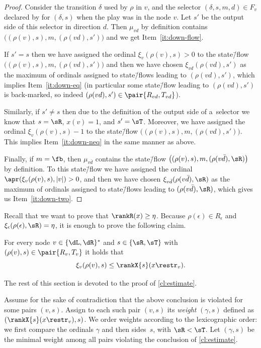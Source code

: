 \documentclass{lmcs}
\numberwithin{equation}{section}
\numberwithin{figure}{section}
\begin{document}
\begin{proof}	
	Consider the transition $\delta$ used by $\rho$ in $v$,
	and the selector $(\delta,s,m,d)\in F_v$ declared by \eve for $(\delta,s)$ when the play was in the node $v$.
	Let $s'$ be the output side of this selector in direction $d$.
	Then $\mu_{vd}$ by definition contains $\big((\rho(v),s),m,(\rho(vd),s')\big)$ and we get Item~\ref{it:down-flow}.

	If $s'=s$ then we have assigned the ordinal $\xi_v(\rho(v),s)>0$ to the state\=/flow $\big((\rho(v),s),\allowbreak m,\allowbreak (\rho(vd),s')\big)$
	and then we have chosen $\xi_{vd}(\rho(vd),s')$ as the maximum of ordinals assigned to state\=/flows leading to $(\rho(vd),s')$,
	which implies Item~\ref{it:down-eq} (in particular some state\=/flow leading to $(\rho(vd),s')$ is back-marked, so indeed $(\rho(vd),s')\in\pair{R_{vd},T_{vd}}$).
	
	Similarly, if $s'\neq s$ then due to the definition of the output side of a~selector we know that $s=\sR$, $x(v)=1$, and $s'=\sT$.
	Moreover, we have assigned the ordinal $\xi_v(\rho(v),s)-1$ to the state\=/flow $\big((\rho(v),s),m,(\rho(vd),s')\big)$.
	This implies Item~\ref{it:down-neq} in the same manner as above.
	
	Finally, if $m=\fb$, then $\mu_{v\bar{d}}$ contains the state\=/flow $\big((\rho(v),s),m,(\rho(v\bar{d}),\sR)\big)$ by definition.
	To this state\=/flow we have assigned the ordinal $\apr(\xi_v(\rho(v),s),|v|)>0$,
	and then we have chosen $\xi_{v\bar{d}}(\rho(v\bar{d}),\sR)$ as the maximum of ordinals assigned to state\=/flows leading to $(\rho(v\bar{d}),\sR)$,
	which gives us Item~\ref{it:down-two}.
\end{proof}

Recall that we want to prove that $\rankR(x)\geq\eta$.
Because $\rho(\epsilon)\in R_\epsilon$ and $\xi_\epsilon(\rho(\epsilon),\sR)=\eta$, it is enough to prove the following claim.

\begin{clm}
\label{cl:estimate}
	For every node $v\in\{\dL,\dR\}^\ast$ and $s\in\{\sR,\sT\}$ with $(\rho(v),s)\in\pair{R_v,T_v}$ it holds that
	\begin{equation}
	\label{eq:estimate}
	\xi_v(\rho(v),s)\leq\rankX{s}(x\restr_v).
	\end{equation}
\end{clm}

The rest of this section is devoted to the proof of \cref{cl:estimate}.

\noindent %
Assume for the sake of contradiction that the above conclusion is violated for some pairs $(v,s)$.
Assign to each such pair $(v,s)$ its \emph{weight} $(\gamma, s)$ defined as $(\rankX{s}(x\restr_v),s)$.
We order weights according to the lexicographic order: we first compare the ordinals $\gamma$ and then sides~$s$, with $\sR<\sT$.
Let $(\gamma, s)$ be the minimal weight among all pairs violating the conclusion of \cref{cl:estimate}.
\end{document}

